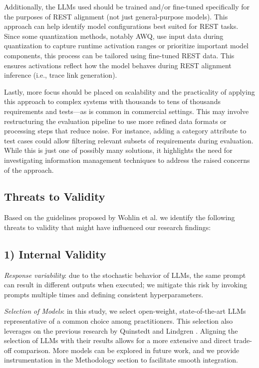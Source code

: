 \documentclass[conference]{IEEEtran}
\begin{document}
Additionally, the LLMs used should be trained and/or fine-tuned specifically for the purposes of REST alignment (not just general-purpose models). This approach can help identify model configurations best suited for REST tasks. Since some quantization methods, notably AWQ, use input data during quantization to capture runtime activation ranges or prioritize important model components, this process can be tailored using fine-tuned REST data. This ensures activations reflect how the model behaves during REST alignment inference (i.e., trace link generation).

Lastly, more focus should be placed on scalability and the practicality of applying this approach to complex systems with thousands to tens of thousands requirements and tests---as is common in commercial settings. This may involve restructuring the evaluation pipeline to use more refined data formats or processing steps that reduce noise. For instance, adding a category attribute to test cases could allow filtering relevant subsets of requirements during evaluation. While this is just one of possibly many solutions, it highlights the need for investigating information management techniques to address the raised concerns of the approach.

\subsection{Threats to Validity}

Based on the guidelines proposed by Wohlin et al. \cite{wohlin2012experimentation} we identify the following threats to validity that might have influenced our research findings: 

\subsection*{\textbf{1) Internal Validity}}

\textit{Response variability}: due to the stochastic behavior of LLMs, the same prompt can result in different outputs when executed; we mitigate this risk by invoking prompts multiple times and defining consistent hyperparameters.

\textit{Selection of Models}: in this study, we select open-weight, state-of-the-art LLMs representative of a common choice among practitioners. This selection also leverages on the previous research by Quinstedt and Lindgren \cite{quinstedt2024Optimizing}. Aligning the selection of LLMs with their results allows for a more extensive and direct trade-off comparison. More models can be explored in future work, and we provide instrumentation in the Methodology section to facilitate smooth integration.
\end{document}
